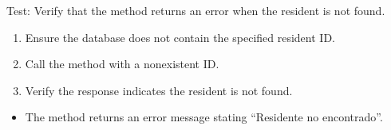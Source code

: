 \documentclass[letterpaper,10pt,english]{sphinxmanual}
\begin{document}
\begin{fulllineitems}
\label{\detokenize{test:test.test_residetnt.test_get_resident_by_id_not_found}}
\pysigstartsignatures
\pysiglinewithargsret
{}
{}
{}
\pysigstopsignatures
\sphinxAtStartPar
Test: Verify that the method returns an error when the resident is not found.
\begin{description}
\begin{enumerate}
%
\item {} 
\sphinxAtStartPar
Ensure the database does not contain the specified resident ID.

\item {} 
\sphinxAtStartPar
Call the  method with a non\sphinxhyphen{}existent ID.

\item {} 
\sphinxAtStartPar
Verify the response indicates the resident is not found.

\end{enumerate}

\begin{itemize}
\item {} 
\sphinxAtStartPar
The method returns an error message stating “Residente no encontrado”.

\end{itemize}

\end{description}

\end{fulllineitems}

\end{document}
